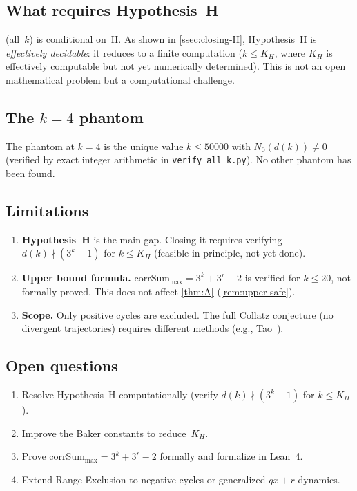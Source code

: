 \documentclass[11pt, a4paper]{amsart}
\theoremstyle{plain}
\theoremstyle{definition}
\theoremstyle{remark}
\newcommand{\corrSum}{\mathrm{corrSum}}
\begin{document}
\subsection{What requires Hypothesis~H}\label{ssec:conditional}

 (all~$k$) is conditional on~H.
As shown in \cref{ssec:closing-H}, Hypothesis~H is
\emph{effectively decidable}: it reduces to a finite
computation ($k \leq K_H$, where $K_H$ is effectively
computable but not yet numerically determined).
This is not an open mathematical problem but a computational
challenge.

\subsection{The $k = 4$ phantom}\label{ssec:phantom}

The phantom at $k = 4$ is the unique value
$k \leq 50000$ with $N_0(d(k)) \neq 0$
(verified by exact integer arithmetic in
\texttt{verify\_all\_k.py}).
No other phantom has been found.

\subsection{Limitations}\label{ssec:limits}

\begin{enumerate}
  \item \textbf{Hypothesis~H} is the main gap.
    Closing it requires verifying $d(k) \nmid (3^k-1)$
    for $k \leq K_H$ (feasible in principle, not yet done).
  \item \textbf{Upper bound formula.}
    $\corrSum_{\max} = 3^k + 3^r - 2$ is verified for
    $k \leq 20$, not formally proved.
    This does not affect \cref{thm:A}
    (\cref{rem:upper-safe}).
  \item \textbf{Scope.}
    Only positive cycles are excluded.
    The full Collatz conjecture (no divergent trajectories)
    requires different methods
    (e.g., Tao~\cite{Tao2022}).
\end{enumerate}

\subsection{Open questions}\label{ssec:open}

\begin{enumerate}
  \item Resolve Hypothesis~H computationally
    (verify $d(k) \nmid (3^k-1)$ for $k \leq K_H$).
  \item Improve the Baker constants to reduce~$K_H$.
  \item Prove $\corrSum_{\max} = 3^k + 3^r - 2$ formally
    and formalize in Lean~4.
  \item Extend Range Exclusion to negative cycles or
    generalized $qx{+}r$ dynamics.
\end{enumerate}
\end{document}
